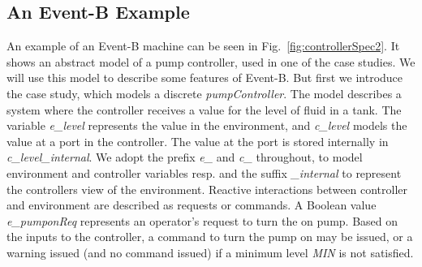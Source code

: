 \subsection{An Event-B Example}
An example of an Event-B machine can be seen in Fig.~\ref{fig:controllerSpec2}. It shows an abstract model of a pump controller, used in one of the case studies. We will use this model to describe some features of Event-B. But first we introduce the case study, which models a discrete \emph{pumpController}. The model describes a system where the controller receives a value for the level of fluid in a tank. The variable \emph{e\_level} represents the value in the environment, and \emph{c\_level} models the value at a port in the controller. The value at the port is stored internally in \emph{c\_level\_internal}. We adopt the prefix \emph{e\_} and \emph{c\_} throughout, to model environment and controller variables resp. and the suffix \emph{\_internal} to represent the controllers view of the environment. Reactive interactions between controller and environment are described as requests or commands. A Boolean value \emph{e\_pumponReq} represents an operator's request to turn the on pump. Based on the inputs to the controller, a command to turn the pump on may be issued, or a warning issued (and no command issued) if a minimum level \emph{MIN} is not satisfied.    
%
%
%

